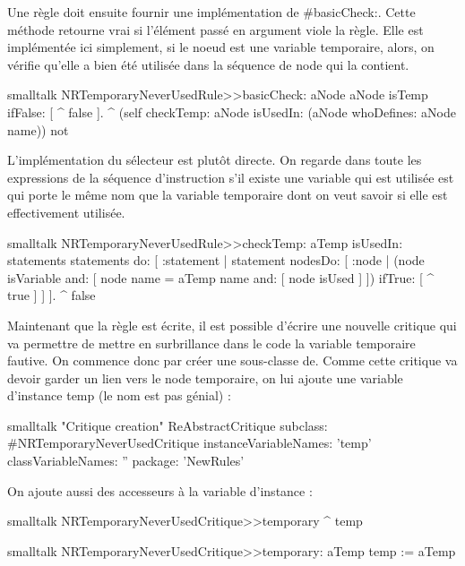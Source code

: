 \documentclass[10pt,twoside,english]{_support/latex/sbabook/sbabook}
\begin{document}
Une r\`{e}gle doit ensuite fournir une impl\'{e}mentation de \#basicCheck:. Cette
m\'{e}thode retourne vrai si l'\'{e}l\'{e}ment pass\'{e} en argument viole la r\`{e}gle. Elle est
impl\'{e}ment\'{e}e ici simplement, si le noeud est une variable temporaire, alors, on
v\'{e}rifie qu'elle a bien \'{e}t\'{e} utilis\'{e}e dans la s\'{e}quence de node qui la contient.
\begin{displaycode}{smalltalk}
NRTemporaryNeverUsedRule>>basicCheck: aNode
	aNode isTemp ifFalse: [ ^ false ].
	^ (self checkTemp: aNode isUsedIn: (aNode whoDefines: aNode name)) not
\end{displaycode}

L'impl\'{e}mentation du s\'{e}lecteur  est plut\^{o}t directe. On
regarde dans toute les expressions de la s\'{e}quence d'instruction s'il existe une
variable qui est utilis\'{e}e est qui porte le m\^{e}me nom que la variable temporaire
dont on veut savoir si elle est effectivement utilis\'{e}e.
\begin{displaycode}{smalltalk}
NRTemporaryNeverUsedRule>>checkTemp: aTemp isUsedIn: statements
	statements
		do: [ :statement |
			statement
				nodesDo: [ :node |
					(node isVariable and: [ node name = aTemp name and: [ node isUsed ] ])
						ifTrue: [ ^ true ] ] ].
	^ false
\end{displaycode}

Maintenant que la r\`{e}gle est \'{e}crite, il est possible d'\'{e}crire une nouvelle
critique qui va permettre de mettre en surbrillance dans le code la variable
temporaire fautive. On commence donc par cr\'{e}er une sous-classe de. Comme cette critique va devoir garder un lien vers le node
temporaire, on lui ajoute une variable d'instance temp (le nom est pas g\'{e}nial) :
\begin{displaycode}{smalltalk}
"Critique creation"
ReAbstractCritique subclass: #NRTemporaryNeverUsedCritique
instanceVariableNames: 'temp'
classVariableNames: ''
package: 'NewRules'
\end{displaycode}

On ajoute aussi des accesseurs \`{a} la variable d'instance :
\begin{displaycode}{smalltalk}
NRTemporaryNeverUsedCritique>>temporary
	^ temp
\end{displaycode}
\begin{displaycode}{smalltalk}
NRTemporaryNeverUsedCritique>>temporary: aTemp
	temp := aTemp
\end{displaycode}
\end{document}
